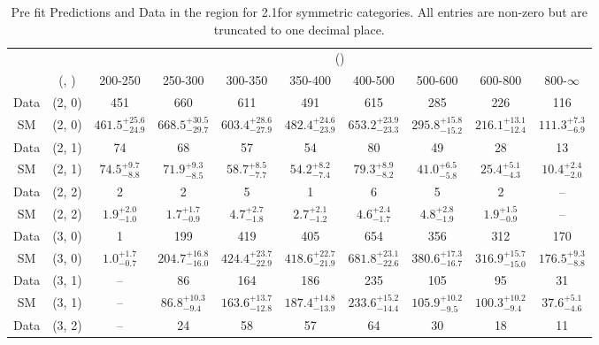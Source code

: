 \begin{table}[h!]
\tiny
\centering
\caption{Pre fit Predictions and Data in the \mj region for 2.1\ifb for symmetric categories. All entries are non-zero but are truncated to one decimal place.\label{tab:predallqcdnaive_mu_comb_sym}}
\begin{tabular}
{cccccccccc}
	\hline\hline
	&	& \multicolumn{8}{c}{\scalht (\gev)}\\ 
	&	 (\njet, \nb) & 200-250 & 250-300 & 300-350 & 350-400 & 400-500 & 500-600 & 600-800 & 800-$\infty$ \\ [0.8ex] 
\hline
	Data & (2, 0) & 451 & 660 & 611 & 491 & 615 & 285 & 226 & 116 \\[0.5ex] 
	SM & (2, 0) & $461.5^{+ 25.6 }_{- 24.9 }$ & $668.5^{+ 30.5 }_{- 29.7 }$ & $603.4^{+ 28.6 }_{- 27.9 }$ & $482.4^{+ 24.6 }_{- 23.9 }$ & $653.2^{+ 23.9 }_{- 23.3 }$ & $295.8^{+ 15.8 }_{- 15.2 }$ & $216.1^{+ 13.1 }_{- 12.4 }$ & $111.3^{+ 7.3 }_{- 6.9 }$ \\[0.5ex] 
	Data & (2, 1) & 74 & 68 & 57 & 54 & 80 & 49 & 28 & 13 \\[0.5ex] 
	SM & (2, 1) & $74.5^{+ 9.7 }_{- 8.8 }$ & $71.9^{+ 9.3 }_{- 8.5 }$ & $58.7^{+ 8.5 }_{- 7.7 }$ & $54.2^{+ 8.2 }_{- 7.4 }$ & $79.3^{+ 8.9 }_{- 8.2 }$ & $41.0^{+ 6.5 }_{- 5.8 }$ & $25.4^{+ 5.1 }_{- 4.3 }$ & $10.4^{+ 2.4 }_{- 2.0 }$ \\[0.5ex] 
	Data & (2, 2) & 2 & 2 & 5 & 1 & 6 & 5 & 2 & -- \\[0.5ex] 
	SM & (2, 2) & $1.9^{+ 2.0 }_{- 1.0 }$ & $1.7^{+ 1.7 }_{- 0.9 }$ & $4.7^{+ 2.7 }_{- 1.8 }$ & $2.7^{+ 2.1 }_{- 1.2 }$ & $4.6^{+ 2.4 }_{- 1.7 }$ & $4.8^{+ 2.8 }_{- 1.9 }$ & $1.9^{+ 1.5 }_{- 0.9 }$ & -- \\[0.5ex] 
	Data & (3, 0) & 1 & 199 & 419 & 405 & 654 & 356 & 312 & 170 \\[0.5ex] 
	SM & (3, 0) & $1.0^{+ 1.7 }_{- 0.7 }$ & $204.7^{+ 16.8 }_{- 16.0 }$ & $424.4^{+ 23.7 }_{- 22.9 }$ & $418.6^{+ 22.7 }_{- 21.9 }$ & $681.8^{+ 23.1 }_{- 22.6 }$ & $380.6^{+ 17.3 }_{- 16.7 }$ & $316.9^{+ 15.7 }_{- 15.0 }$ & $176.5^{+ 9.3 }_{- 8.8 }$ \\[0.5ex] 
	Data & (3, 1) & -- & 86 & 164 & 186 & 235 & 105 & 95 & 31 \\[0.5ex] 
	SM & (3, 1) & -- & $86.8^{+ 10.3 }_{- 9.4 }$ & $163.6^{+ 13.7 }_{- 12.8 }$ & $187.4^{+ 14.8 }_{- 13.9 }$ & $233.6^{+ 15.2 }_{- 14.4 }$ & $105.9^{+ 10.2 }_{- 9.5 }$ & $100.3^{+ 10.2 }_{- 9.4 }$ & $37.6^{+ 5.1 }_{- 4.6 }$ \\[0.5ex] 
	Data & (3, 2) & -- & 24 & 58 & 57 & 64 & 30 & 18 & 11 \\[0.5ex] 

\end{tabular}
\end{table}
